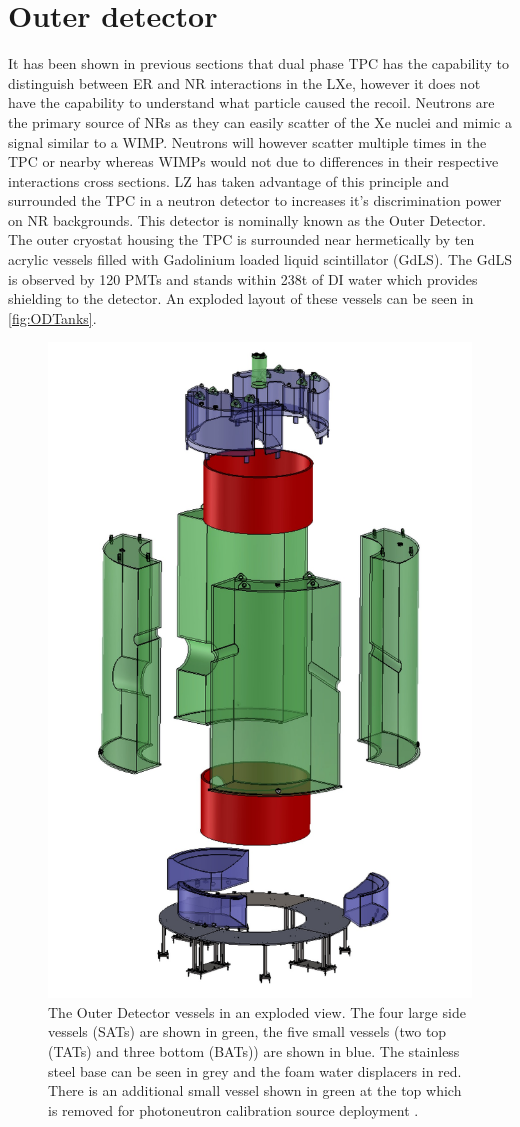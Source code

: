 \section{Outer detector}\label{sec:LZ/LZOD}
It has been shown in previous sections that dual phase TPC has the capability to distinguish between ER and NR interactions in the LXe, however it does not have the capability to understand what particle caused the recoil. Neutrons are the primary source of NRs as they can easily scatter of the Xe nuclei and mimic a signal similar to a WIMP. Neutrons will however scatter multiple times in the TPC or nearby whereas WIMPs would not due to differences in their respective interactions cross sections. LZ has taken advantage of this principle and surrounded the TPC in a neutron detector to increases it's discrimination power on NR backgrounds. This detector is nominally known as the Outer Detector.
The outer cryostat housing the TPC is surrounded near hermetically by ten acrylic vessels filled with  Gadolinium loaded liquid scintillator (GdLS). The GdLS is observed by 120 PMTs and stands within 238t of DI water which provides shielding to the detector. An exploded layout of these vessels can be seen in \autoref{fig:ODTanks}.
\begin{figure}
    \centering
    \includegraphics[width=0.5\linewidth]{figures/LZ/CAD_ODTanks.jpg}
    \caption{The Outer Detector vessels in an exploded view. The four large side vessels (SATs) are shown in green, the five small vessels (two top (TATs) and three bottom (BATs)) are shown in blue. The stainless steel base can be seen in grey and the foam water displacers in red. There is an additional small vessel shown in green at the top which is removed for photoneutron calibration source deployment \cite{LZNIMA}.}
    \label{fig:ODTanks}
\end{figure}

